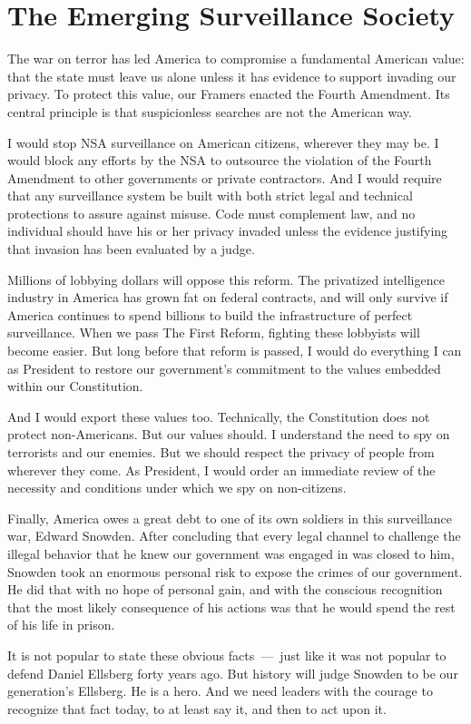 \section{The Emerging Surveillance Society}

The war on terror has led America to compromise a fundamental American value: that the state must leave us alone unless it has evidence to support invading our privacy. To protect this value, our Framers enacted the Fourth Amendment. Its central principle is that suspicionless searches are not the American way.

I would stop NSA surveillance on American citizens, wherever they may be. I would block any efforts by the NSA to outsource the violation of the Fourth Amendment to other governments or private contractors. And I would require that any surveillance system be built with both strict legal and technical protections to assure against misuse. Code must complement law, and no individual should have his or her privacy invaded unless the evidence justifying that invasion has been evaluated by a judge.

Millions of lobbying dollars will oppose this reform. The privatized intelligence industry in America has grown fat on federal contracts, and will only survive if America continues to spend billions to build the infrastructure of perfect surveillance. When we pass The First Reform, fighting these lobbyists will become easier. But long before that reform is passed, I would do everything I can as President to restore our government's commitment to the values embedded within our Constitution.

And I would export these values too. Technically, the Constitution does not protect non-Americans. But our values should. I understand the need to spy on terrorists and our enemies. But we should respect the privacy of people from wherever they come. As President, I would order an immediate review of the necessity and conditions under which we spy on non-citizens.

Finally, America owes a great debt to one of its own soldiers in this surveillance war, Edward Snowden. After concluding that every legal channel to challenge the illegal behavior that he knew our government was engaged in was closed to him, Snowden took an enormous personal risk to expose the crimes of our government. He did that with no hope of personal gain, and with the conscious recognition that the most likely consequence of his actions was that he would spend the rest of his life in prison.

It is not popular to state these obvious facts~---~just like it was not popular to defend Daniel Ellsberg forty years ago. But history will judge Snowden to be our generation's Ellsberg. He is a hero. And we need leaders with the courage to recognize that fact today, to at least say it, and then to act upon it.
